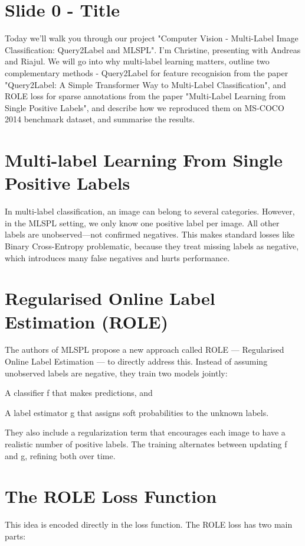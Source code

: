 \documentclass[12pt,a4paper]{article}
\begin{document}
\section*{Slide 0 - Title}

Today we'll walk you through our project "Computer Vision - Multi-Label Image Classification: Query2Label and MLSPL". I'm Christine, presenting with Andreas and Riajul. We will go into why multi-label learning matters, outline two complementary methods - Query2Label for feature recognision from the paper "Query2Label: A Simple Transformer Way to Multi-Label Classification", and ROLE loss for sparse annotations from the paper "Multi-Label Learning from Single Positive Labels", and describe how we reproduced them on MS-COCO 2014 benchmark dataset, and summarise the results.

\section*{Multi-label Learning From Single Positive Labels}
In multi-label classification, an image can belong to several categories.
However, in the MLSPL setting, we only know one positive label per image.
All other labels are unobserved—not confirmed negatives.
This makes standard losses like Binary Cross-Entropy problematic, because they treat missing labels as negative, which introduces many false negatives and hurts performance.

\section*{Regularised Online Label Estimation (ROLE)}
The authors of MLSPL propose a new approach called ROLE — Regularised Online Label Estimation — to directly address this.
Instead of assuming unobserved labels are negative, they train two models jointly:

A classifier f that makes predictions, and

A label estimator g that assigns soft probabilities to the unknown labels.

They also include a regularization term that encourages each image to have a realistic number of positive labels.
The training alternates between updating f and g, refining both over time.

\section*{The ROLE Loss Function}
This idea is encoded directly in the loss function.
The ROLE loss has two main parts:
\end{document}
